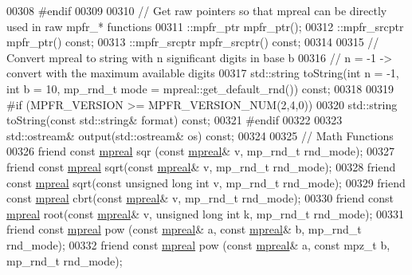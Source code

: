 \begin{DoxyCode}
00308 \textcolor{preprocessor}{#endif}
00309 
00310     \textcolor{comment}{// Get raw pointers so that mpreal can be directly used in raw mpfr\_* functions}
00311     ::mpfr\_ptr    mpfr\_ptr();
00312     ::mpfr\_srcptr mpfr\_ptr()    \textcolor{keyword}{const};
00313     ::mpfr\_srcptr mpfr\_srcptr() \textcolor{keyword}{const};
00314 
00315     \textcolor{comment}{// Convert mpreal to string with n significant digits in base b}
00316     \textcolor{comment}{// n = -1 -> convert with the maximum available digits}
00317     std::string toString(\textcolor{keywordtype}{int} n = -1, \textcolor{keywordtype}{int} b = 10, mp\_rnd\_t mode = mpreal::get\_default\_rnd()) \textcolor{keyword}{const};
00318 
00319 \textcolor{preprocessor}{#if (MPFR\_VERSION >= MPFR\_VERSION\_NUM(2,4,0))}
00320     std::string toString(\textcolor{keyword}{const} std::string& format) \textcolor{keyword}{const};
00321 \textcolor{preprocessor}{#endif}
00322 
00323     std::ostream& output(std::ostream& os) \textcolor{keyword}{const};
00324 
00325     \textcolor{comment}{// Math Functions}
00326     \textcolor{keyword}{friend} \textcolor{keyword}{const} \hyperlink{classmpfr_1_1mpreal}{mpreal} sqr (\textcolor{keyword}{const} \hyperlink{classmpfr_1_1mpreal}{mpreal}& v, mp\_rnd\_t rnd\_mode);
00327     \textcolor{keyword}{friend} \textcolor{keyword}{const} \hyperlink{classmpfr_1_1mpreal}{mpreal} sqrt(\textcolor{keyword}{const} \hyperlink{classmpfr_1_1mpreal}{mpreal}& v, mp\_rnd\_t rnd\_mode);
00328     \textcolor{keyword}{friend} \textcolor{keyword}{const} \hyperlink{classmpfr_1_1mpreal}{mpreal} sqrt(\textcolor{keyword}{const} \textcolor{keywordtype}{unsigned} \textcolor{keywordtype}{long} \textcolor{keywordtype}{int} v, mp\_rnd\_t rnd\_mode);
00329     \textcolor{keyword}{friend} \textcolor{keyword}{const} \hyperlink{classmpfr_1_1mpreal}{mpreal} cbrt(\textcolor{keyword}{const} \hyperlink{classmpfr_1_1mpreal}{mpreal}& v, mp\_rnd\_t rnd\_mode);
00330     \textcolor{keyword}{friend} \textcolor{keyword}{const} \hyperlink{classmpfr_1_1mpreal}{mpreal} root(\textcolor{keyword}{const} \hyperlink{classmpfr_1_1mpreal}{mpreal}& v, \textcolor{keywordtype}{unsigned} \textcolor{keywordtype}{long} \textcolor{keywordtype}{int} k, mp\_rnd\_t rnd\_mode);
00331     \textcolor{keyword}{friend} \textcolor{keyword}{const} \hyperlink{classmpfr_1_1mpreal}{mpreal} pow (\textcolor{keyword}{const} \hyperlink{classmpfr_1_1mpreal}{mpreal}& a, \textcolor{keyword}{const} \hyperlink{classmpfr_1_1mpreal}{mpreal}& b, mp\_rnd\_t rnd\_mode);
00332     \textcolor{keyword}{friend} \textcolor{keyword}{const} \hyperlink{classmpfr_1_1mpreal}{mpreal} pow (\textcolor{keyword}{const} \hyperlink{classmpfr_1_1mpreal}{mpreal}& a, \textcolor{keyword}{const} mpz\_t b, mp\_rnd\_t rnd\_mode);

\end{DoxyCode}

